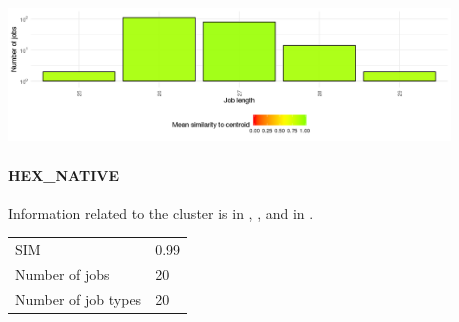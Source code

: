 \documentclass[]{llncs}
\begin{document}
\begingroup
  \centering
  \includegraphics[width=4.61in,height=1.39in]{./media/image17.png}
  \label{fig:use_case:hex_lev:length}
\endgroup

\paragraph{HEX\_NATIVE}
Information related to the cluster is in , , and in .

\begingroup
  \centering
  \begin{tabular}{ll}
    SIM & 0.99 \\
    Number of jobs & 20 \\
    Number of job types & 20 \\
  \end{tabular}
  \label{tab:use_case:hex_native:stats}
\endgroup
\end{document}
